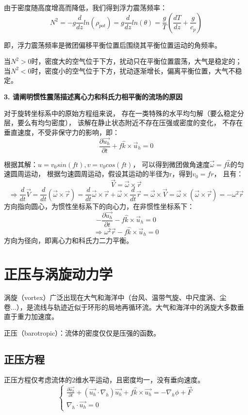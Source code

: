 \documentclass{article}
\begin{document}
由于密度随高度增高而降低，我们得到浮力震荡频率：
$$N^2=-g\frac{d}{dz}ln(\rho_{pot}) 
= g\frac{d}{dz}ln(\theta) 
= \frac{g}{T}(\frac{dT}{dz} + \frac{g}{c_p})$$

即，浮力震荡频率是微团偏移平衡位置后围绕其平衡位置运动的角频率。

当$N^2>0$时，密度大的空气位于下方，扰动只在平衡位置震荡，大气是稳定的；
当$N^2<0$时，密度小的空气位于下方，扰动逐渐增长，偏离平衡位置，大气不稳定。

\textbf{3. 请阐明惯性震荡描述离心力和科氏力相平衡的流场的原因}

对于旋转坐标系中的原始方程组来说，
存在一类特殊的水平均匀解（要么稳定分层，要么有均匀密度），
该解在静止状态附近不存在压强或密度的变化，
不存在垂直速度，不受非保守力的影响，即：
$$\frac{\partial \vec{u_h}}{\partial t} + f\hat{k}\times\vec{u}_h = 0$$

根据其解：$u = v_0sin(ft), v=v_0cos(ft)$，
可以得到微团做角速度$\vec{\omega} = f\hat{k}$的匀速圆周运动，
根据匀速圆周运动，假设其运动的半径为r，得到$v_0 = fr$，
且有：$$\vec{V} = \vec{\omega}\times\vec{r}$$
$$\Rightarrow \frac{d}{dt}\vec{V} 
= \frac{d}{dt}(\vec{\omega}\times\vec{r})
= \frac{d}{dt}\vec{\omega}\times\vec{r} 
+\vec{\omega}\times\frac{d}{dt}\vec{r}
= \vec{\omega}\times\vec{V} 
= \vec{\omega}\times(\vec{\omega}\times\vec{r})
= -\omega^2 \vec{r}$$
方向指向圆心，为惯性坐标系下的向心力，在非惯性坐标系下：
$$-\frac{\partial \vec{u_h}}{\partial t} - f\hat{k}\times\vec{u}_h = 0$$
$$\Rightarrow \omega^2 \vec{r} - f\hat{k}\times\vec{u}_h = 0$$
方向为径向，即离心力和科氏力二力平衡。

\newpage
\section{正压与涡旋动力学}
涡旋（vortex）广泛出现在大气和海洋中（台风、温带气旋、中尺度涡、尘卷...），是流线与轨迹近似于环形的局地再循环流。大气和海洋中的涡旋大多数垂直于重力加速度。

正压（barotropic）：流体的密度仅仅是压强的函数。

\subsection{正压方程}
正压方程仅考虑流体的$2$维水平运动，且密度均一，没有垂向速度。
$$\begin{cases}
\frac{\partial \vec{u_h}}{\partial t}+(\vec{u_h}\cdot\nabla_h)\vec{u_h}+f\hat{k}\times\vec{u_h} = -\nabla_h \phi + \vec{F}\\
\nabla_h\cdot\vec{u_h} = 0
\end{cases}$$
\end{document}
